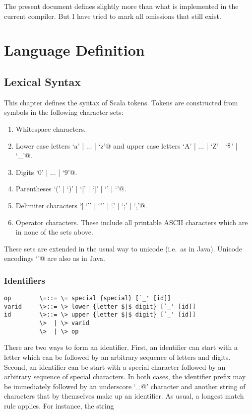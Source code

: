 \documentclass[11pt]{report}
\begin{document}
The present document defines slightly more than what is implemented in
the current compiler. But I have tried to mark all omissions that
still exist.

\part{Language Definition}

\chapter{Lexical Syntax}

This chapter defines the syntax of Scala tokens. Tokens are
constructed from symbols in the following character sets:
\begin{enumerate}
\item Whitespace characters.
\item Lower case letters \verb@`a' | ... | `z'@ and
upper case letters \verb@`A' | ... | `Z' | `$\Dollar$' | `_'@.
\item Digits \verb@`0' | ... | `9'@.
\item Parentheses \verb@`(' | `)' | `[' | `]' | `{' | `}'@.
\item Delimiter characters \verb@`\' | `'' | `"' | `.' | `;' | `,'@.
\item Operator characters. These include all printable ASCII characters
which are in none of the sets above.
\end{enumerate}

These sets are extended in the usual way to unicode (i.e.\ as in Java).
Unicode encodings \verb@`\uXXXX'@ are also as in Java.

\section{Identifiers}

\syntax\begin{verbatim}
op        \=::= \= special {special} [`_' [id]]
varid     \>::= \> lower {letter $|$ digit} [`_' [id]]
id        \>::= \> upper {letter $|$ digit} [`_' [id]]
          \>  | \> varid
          \>  | \> op
\end{verbatim}

There are two ways to form an identifier. First, an identifier can
start with a letter which can be followed by an arbitrary sequence of
letters and digits. Second, an identifier can be start with a special
character followed by an arbitrary sequence of special characters.
In both cases, the identifier prefix may be immediately followed
by an underscore `\verb@_@' character and another string of characters
that by themselves make up an identifier.  As usual, a longest match
rule applies. For instance, the string
\end{document}
